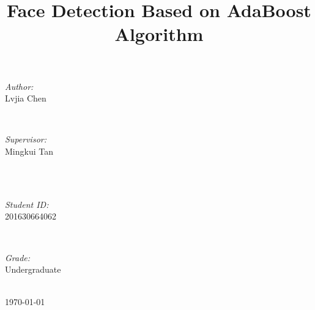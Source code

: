 \documentclass[journal, a4paper, onecolumn]{IEEEtran}
\begin{document}
\begin{titlepage}
\begin{minipage}{0.4\textwidth}
\begin{flushleft} \large
\emph{Author:}\\
Lvjia Chen %
\end{flushleft}
\end{minipage}
~
\begin{minipage}{0.4\textwidth}
\begin{flushright} \large
\emph{Supervisor:} \\
Mingkui Tan %
\end{flushright}
\end{minipage}\\[2cm]
~
\begin{minipage}{0.4\textwidth}
\begin{flushleft} \large
\emph{Student ID:}\\
201630664062
\end{flushleft}
\end{minipage}
~
\begin{minipage}{0.4\textwidth}
\begin{flushright} \large
\emph{Grade:} \\
Undergraduate
\end{flushright}
\end{minipage}\\[2cm]



{\large \today}\\[2cm] %

 

\vfill %

\end{titlepage}

	\title{Face Detection Based on AdaBoost Algorithm}
	\maketitle
\end{document}
